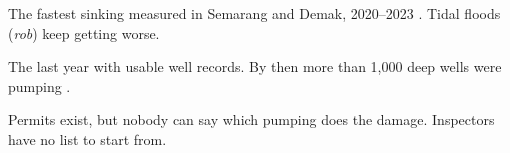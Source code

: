 \begin{tcbraster}[raster columns=3,raster equal height,raster column skip=3mm,raster before skip=1mm,raster after skip=0mm]
\begin{tcolorbox}[tile=warmsoft]
The fastest sinking measured in Semarang and Demak, 2020--2023 \cite{janur2025}. Tidal floods (\emph{rob}) keep getting worse.
\end{tcolorbox}
\begin{tcolorbox}[tile=warmsoft]
The last year with usable well records. By then more than 1,000 deep wells were pumping
\cite{lo2022,putranto2016}.
\end{tcolorbox}
\begin{tcolorbox}[tile=warmsoft]
Permits exist, but nobody can say which pumping does the damage. Inspectors have no list to
start from.
\end{tcolorbox}
\end{tcbraster}

